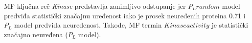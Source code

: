 MF ključna reč \textit{Kinase} predstavlja zanimljivo odstupanje jer $P_L
random$ model predviđa statistički značajnu uređenost iako je prosek neuređenih
proteina 0.71 i $P_L$ model predviđa neuređenost. Takođe, MF termin $Kinase
activity$ je statistički značajno neuređena ($P_L$ model).

%
%
%
%
%


